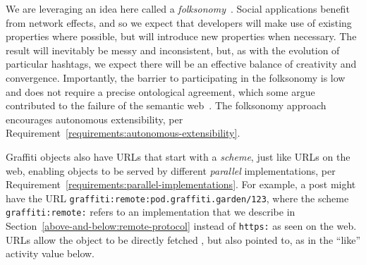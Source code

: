We are leveraging an idea here called a \emph{folksonomy}~\cite{folksonomy}.
Social applications
benefit from network effects, and so we expect that developers will make use of
existing properties where possible,
but will introduce new properties when necessary.
The result will inevitably be messy and inconsistent, but, as with the evolution of
particular hashtags, we expect there will be an effective balance of creativity and convergence.
Importantly, the barrier to participating in the folksonomy is low
and does not require a precise ontological agreement,
which some argue contributed to the failure of the semantic
web~\cite{semanticwebtwodecades}.
The folksonomy approach encourages autonomous extensibility,
per Requirement~\ref{requirements:autonomous-extensibility}.

Graffiti objects also have URLs that
start with a \emph{scheme}, just like URLs on the web,
enabling objects to be served by different \emph{parallel} implementations,
per Requirement~{\ref{requirements:parallel-implementations}}.
For example, a post might have the URL
\texttt{graffiti:\allowbreak{}remote:\allowbreak{}pod.\allowbreak{}graffiti.\allowbreak{}garden/\allowbreak{}123},
where the scheme \texttt{graffiti:\allowbreak{}remote:} refers to an implementation that we describe
in Section~\ref{above-and-below:remote-protocol}
instead of \texttt{https:} as seen on the web.
URLs allow the object to be directly fetched%
, but also pointed to, as in the
``like'' activity value below.


